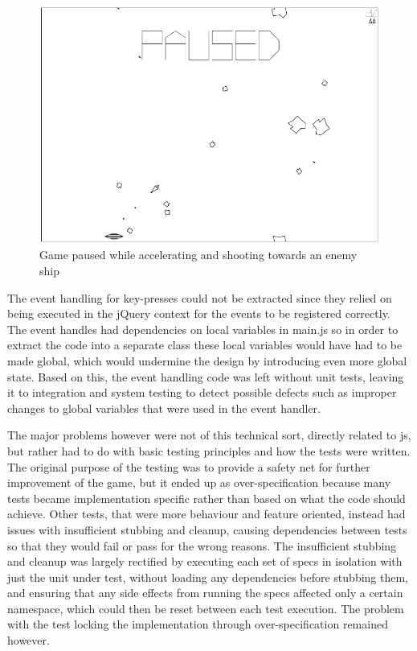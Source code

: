 \documentclass[11pt]{article}
\begin{document}
\begin{figure}[h!]
\centering
\includegraphics[width=1.0\textwidth]{pics/game10.png}
\caption{Game paused while accelerating and shooting towards an enemy ship}
\label{fig:game10}
\end{figure}

The event handling for key-presses could not be extracted since they relied on being executed in the jQuery context for the events to be registered correctly. The event handles had dependencies on local variables in main.js so in order to extract the code into a separate class these local variables would have had to be made global, which would undermine the design by introducing even more global state. Based on this, the event handling code was left without unit tests, leaving it to integration and system testing to detect possible defects such as improper changes to global variables that were used in the event handler.

The major problems however were not of this technical sort, directly related to \gls{js}, but rather had to do with basic testing principles and how the tests were written. The original purpose of the testing was to provide a safety net for further improvement of the game, but it ended up as over-specification because many tests became implementation specific rather than based on what the code should achieve. Other tests, that were more behaviour and feature oriented, instead had issues with insufficient stubbing and cleanup, causing dependencies between tests so that they would fail or pass for the wrong reasons. The insufficient stubbing and cleanup was largely rectified by executing each set of specs in isolation with just the unit under test, without loading any dependencies before stubbing them, and ensuring that any side effects from running the specs affected only a certain namespace, which could then be reset between each test execution. The problem with the test locking the implementation through over-specification remained however.
\end{document}
